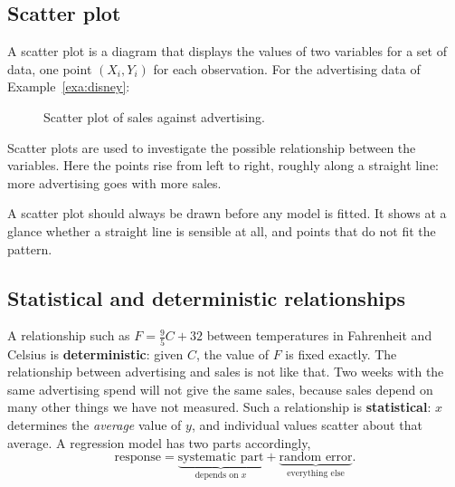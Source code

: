 \documentclass[11pt,a4paper]{article}
\numberwithin{equation}{section}
\theoremstyle{definition}
\begin{document}
\subsection{Scatter plot}
A scatter plot is a diagram that displays the values of two variables for a set of data,
one point $(X_i, Y_i)$ for each observation. For the advertising data of
Example~\ref{exa:disney}:

\begin{figure}[H]
\centering
{}
\caption{Scatter plot of sales against advertising.}
\end{figure}

Scatter plots are used to investigate the possible relationship between the variables.
Here the points rise from left to right, roughly along a straight line: more advertising
goes with more sales.

A scatter plot should always be drawn before any model is fitted. It shows at a glance
whether a straight line is sensible at all, and points that do not fit the pattern.

\subsection{Statistical and deterministic relationships}
A relationship such as $F = \frac95 C + 32$ between temperatures in Fahrenheit and Celsius is
\textbf{deterministic}: given $C$, the value of $F$ is fixed exactly. The relationship between
advertising and sales is not like that. Two weeks with the same advertising spend will not
give the same sales, because sales depend on many other things we have not measured. Such a
relationship is \textbf{statistical}: $x$ determines the \emph{average} value of $y$, and
individual values scatter about that average. A regression model has two parts accordingly,
\[
\text{response} = \underbrace{\text{systematic part}}_{\text{depends on } x}
               + \underbrace{\text{random error}}_{\text{everything else}} .
\]
\end{document}
